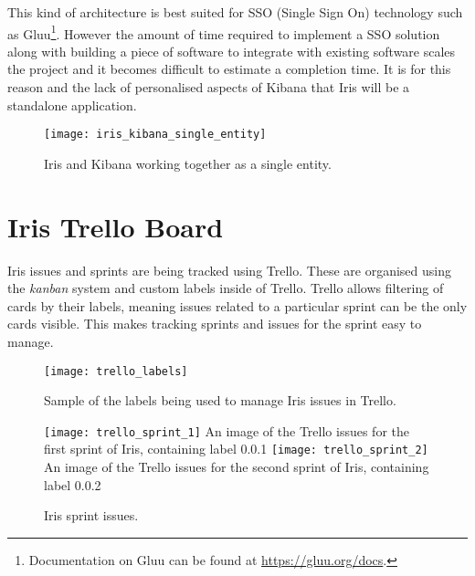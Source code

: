 \documentclass[12pt,a4paper,titlepage]{report}
\begin{document}
\begin{appendices}
This kind of architecture is best suited for SSO (Single Sign On) technology such as Gluu\footnote{Documentation on Gluu can be found at \url{https://gluu.org/docs}.}. However the amount of  time required to implement a SSO solution along with building a piece of software to integrate with existing software scales the project and it becomes difficult to estimate a completion time. It is for this reason and the lack of personalised aspects of Kibana that Iris will be a standalone application.

\begin{figure}[H]
\begin{tcolorbox}
\centerline{\texttt{[image: iris\_kibana\_single\_entity]}}
\end{tcolorbox}
\caption{Iris and Kibana working together as a single entity.}
\end{figure}

\chapter{Iris Trello Board}\label{sec:trello}

Iris issues and sprints are being tracked using Trello. These are organised using the {\em kanban} system and custom labels inside of Trello. Trello allows filtering of cards by their labels, meaning issues related to a particular sprint can be the only cards visible. This makes tracking sprints and issues for the sprint easy to manage.

\begin{figure}[H]\centering
\begin{tcolorbox}[text width=.8\textwidth]
\centerline{\texttt{[image: trello\_labels]}}
\end{tcolorbox}
\caption{Sample of the labels being used to manage Iris issues in Trello.}
\end{figure}

\begin{figure}[H]
\begin{tcolorbox}
\texttt{[image: trello\_sprint\_1]}
\newline
An image of the Trello issues for the first sprint of Iris, containing label 0.0.1
\newline
\texttt{[image: trello\_sprint\_2]}
\newline
An image of the Trello issues for the second sprint of Iris, containing label 0.0.2
\end{tcolorbox}
\caption{Iris sprint issues.}
\end{figure}


\end{appendices}
\end{document}

